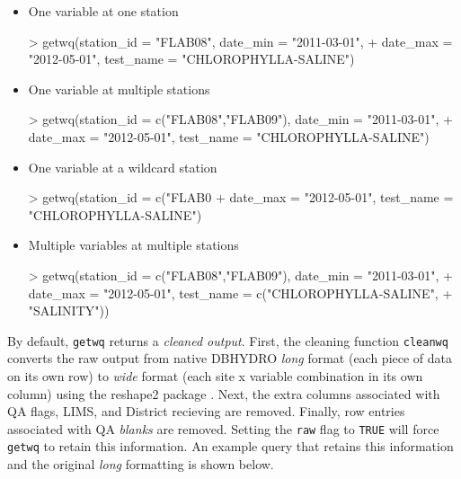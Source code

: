 \documentclass[12pt,notitlepage]{article}
\begin{document}
\begin{itemize}
\item One variable at one station

\begin{Schunk}
\begin{Sinput}
> getwq(station_id = "FLAB08", date_min = "2011-03-01", 
+       date_max = "2012-05-01", test_name = "CHLOROPHYLLA-SALINE")
\end{Sinput}
\end{Schunk}

\item One variable at multiple stations

\begin{Schunk}
\begin{Sinput}
> getwq(station_id = c("FLAB08","FLAB09"), date_min = "2011-03-01",
+       date_max = "2012-05-01", test_name = "CHLOROPHYLLA-SALINE")
\end{Sinput}
\end{Schunk}

\item One variable at a wildcard station

\begin{Schunk}
\begin{Sinput}
> getwq(station_id = c("FLAB0%
+       date_max = "2012-05-01", test_name = "CHLOROPHYLLA-SALINE")
\end{Sinput}
\end{Schunk}

\item Multiple variables at multiple stations

\begin{Schunk}
\begin{Sinput}
> getwq(station_id = c("FLAB08","FLAB09"), date_min = "2011-03-01",
+       date_max = "2012-05-01", test_name = c("CHLOROPHYLLA-SALINE",
+       "SALINITY"))
\end{Sinput}
\end{Schunk}

\end{itemize}

\noindent By default, \verb|getwq| returns a \textit{cleaned output}. First, the cleaning function \verb|cleanwq| converts the raw output from native DBHYDRO \textit{long} format (each piece of data on its own row) to \textit{wide} format (each site x variable combination in its own column) using the reshape2 package \citep{reshape2}. Next, the extra columns associated with QA flags, LIMS, and District recieving are removed. Finally, row entries associated with QA \textit{blanks} are removed. Setting the \texttt{raw} flag to \texttt{TRUE} will force \verb|getwq| to retain this information. An example query that retains this information and the original \textit{long} formatting is shown below.
\end{document}
